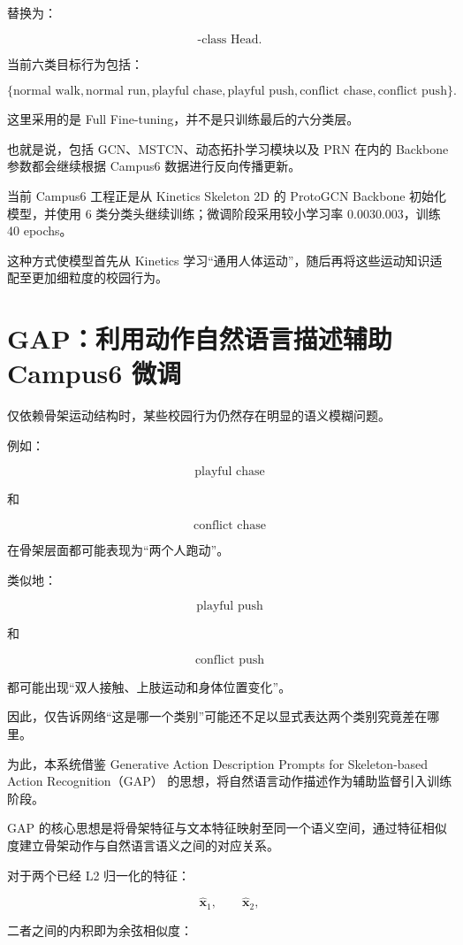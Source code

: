 替换为：

\[
\text{-class Head}.
\]

当前六类目标行为包括：

\[
\{
\text{normal walk},
\text{normal run},
\text{playful chase},
\text{playful push},
\text{conflict chase},
\text{conflict push}
\}.
\]

这里采用的是 Full Fine-tuning，并不是只训练最后的六分类层。

也就是说，包括 GCN、MSTCN、动态拓扑学习模块以及 PRN 在内的 Backbone 参数都会继续根据 Campus6 数据进行反向传播更新。

当前 Campus6 工程正是从 Kinetics Skeleton 2D 的 ProtoGCN Backbone 初始化模型，并使用 6 类分类头继续训练；微调阶段采用较小学习率 0.0030.003，训练 40 epochs。

这种方式使模型首先从 Kinetics 学习“通用人体运动”，随后再将这些运动知识适配至更加细粒度的校园行为。


\section{GAP：利用动作自然语言描述辅助 Campus6 微调}

仅依赖骨架运动结构时，某些校园行为仍然存在明显的语义模糊问题。

例如：

\[
\text{playful chase}
\]

和

\[
\text{conflict chase}
\]

在骨架层面都可能表现为“两个人跑动”。

类似地：

\[
\text{playful push}
\]

和

\[
\text{conflict push}
\]

都可能出现“双人接触、上肢运动和身体位置变化”。

因此，仅告诉网络“这是哪一个类别”可能还不足以显式表达两个类别究竟差在哪里。

为此，本系统借鉴 Generative Action Description Prompts for Skeleton-based Action Recognition（GAP） 的思想，将自然语言动作描述作为辅助监督引入训练阶段。

GAP 的核心思想是将骨架特征与文本特征映射至同一个语义空间，通过特征相似度建立骨架动作与自然语言语义之间的对应关系。

对于两个已经 L2 归一化的特征：

\[
\hat{\mathbf x}_1,
\qquad
\hat{\mathbf x}_2,
\]

二者之间的内积即为余弦相似度：

